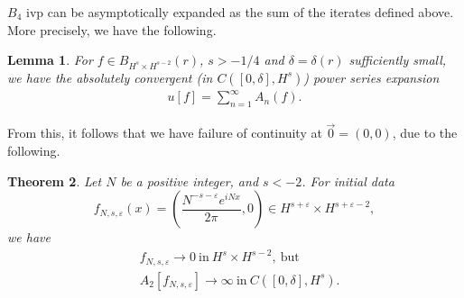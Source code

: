\documentclass[12pt,reqno]{amsart}
\numberwithin{equation}{section}  %
\newcommand{\ee}{\varepsilon}
\newtheorem{theorem}{Theorem}[section]
\newtheorem{lemma}[theorem]{Lemma}
\begin{document}
$B_{4}$ ivp can be asymptotically expanded as the sum of the iterates defined
above. More precisely, we have the following.
\begin{lemma}
  \label{lem:qwp-awp}
  For $f \in B_{H^{s} \times H^{s-2}}(r)$, $s > -1/4$ and $\delta=\delta(r)$
sufficiently small, we have the absolutely convergent
(in $C([0, \delta], H^{s})$) power series expansion
%
%
\begin{equation}
  \label{power-series-soln}
\begin{split}
  u[f] = \sum_{n=1}^{\infty} A_{n}(f).
\end{split}
\end{equation}
%
%
\label{lem:analytic-wp}
\end{lemma}
%
%
From this, it follows that we have failure of continuity at $\vec{0} =
(0, 0)$, due to the
following.
%
%
%
%
%
%
%
%
%
%
%
\begin{theorem}
  Let $N$ be a positive integer, and $s < -2$. For initial data $$f_{N, s, \ee}(x) =  \left ( \frac{N^{-s-\ee}e^{iNx}}{2
  \pi}, 0 \right ) \in
  H^{s + \ee} \times H^{s+ \ee-2},$$ we have
  \begin{equation*}
  \begin{split}
    & f_{N,s,\ee} \to 0 \ \text{in} \ H^{s} \times H^{s-2}, \
    \text{but} 
    \\
    & A_{2}[f_{N,s,\ee}] \to \infty \ \text{in} \ C([0, \delta], H^{s}).
  \end{split}
  \end{equation*}
\label{thm:ill-pos}
\end{theorem}
%
%
%
%
%
%
%
%
%
%
%
\end{document}
